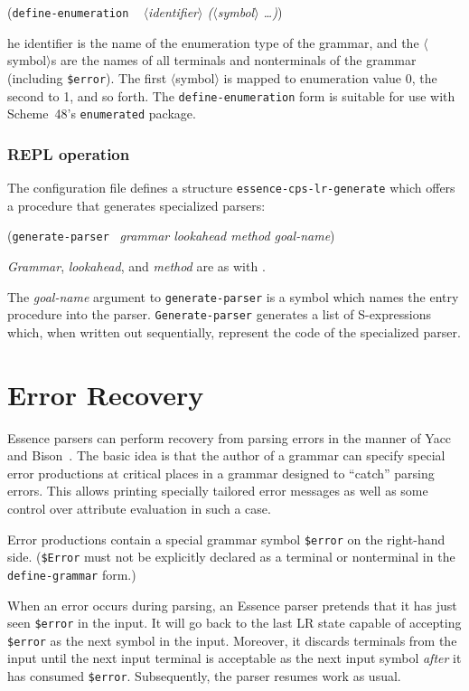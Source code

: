 \documentclass{article}
\newcommand{\meta}[1]{{\noindent\mbox{\textrm{$\langle$#1$\rangle$}}}}
\renewcommand{\var}[1]{\noindent\mbox{\textit{#1}}}
\newcommand{\ide}[1]{{\frenchspacing\textnormal{\texttt{#1}}}}
\newcommand{\pproto}[2]{\unskip%
\mbox{\texonly{\spaceskip=0.5em}#1}%
\mbox{ }\texonly{\nobreak}\htmlonly{ }\textrm{#2}}
\newcommand{\proto}[3]{\par\bigskip\begin{flushleft}\pproto{(\texttt{#1}}{\textit{#2})}\hspace*{\fill}{#3}\end{flushleft}}
\newcommand{\codefont}[1]{\texttt{#1}}
\begin{document}
\proto{define-enumeration}{ \meta{identifier} (\meta{symbol} \ldots)}

The identifier is the name of the enumeration type of the grammar, and
the \meta{symbol}s are the names of all terminals and nonterminals of
the grammar (including \texttt{\$error}).  The first \meta{symbol} is
mapped to enumeration value 0, the second to 1, and so forth.  The
\texttt{define-enumeration} form is suitable for use with Scheme~48's
\texttt{enumerated} package.

\subsubsection*{REPL operation}
The  configuration file defines a
structure \codefont{essence-cps-lr-generate} which offers a procedure that
generates specialized parsers:

\proto{generate-parser}{grammar lookahead method goal-name}{procedure}
%
\var{Grammar}, \var{lookahead}, and \var{method} are as with
\link{\codefont{parse}}{proc:parse}.

The \var{goal-name} argument to \ide{generate-parser} is a symbol
which names the entry procedure into the parser.
\ide{Generate-parser} generates a list of S-expressions which, when
written out sequentially, represent the code of the specialized
parser.

\section{Error Recovery}
\label{sec:error-recovery}

Essence parsers can perform recovery from parsing errors in the manner
of Yacc~\cite{Johnson1975} and Bison~\cite{DonnellyStallman1995}.  The
basic idea is that the author of a grammar can specify special
error productions at critical places in a grammar designed to ``catch''
parsing errors.  This allows printing specially tailored error
messages as well as some control over attribute evaluation in such a
case.

Error productions contain a special grammar symbol \codefont{\$error}
on the right-hand side.  (\codefont{\$Error} must not be explicitly
declared as a terminal or nonterminal in the \codefont{define-grammar}
form.)

When an error occurs during parsing, an Essence parser pretends that
it has just seen \codefont{\$error} in the input.  It will go back to
the last LR state capable of accepting \codefont{\$error} as the next
symbol in the input.  Moreover, it discards terminals from the input
until the next input terminal is acceptable as the next input symbol
\emph{after} it has consumed \codefont{\$error}.  Subsequently, the
parser resumes work as usual.
\end{document}
